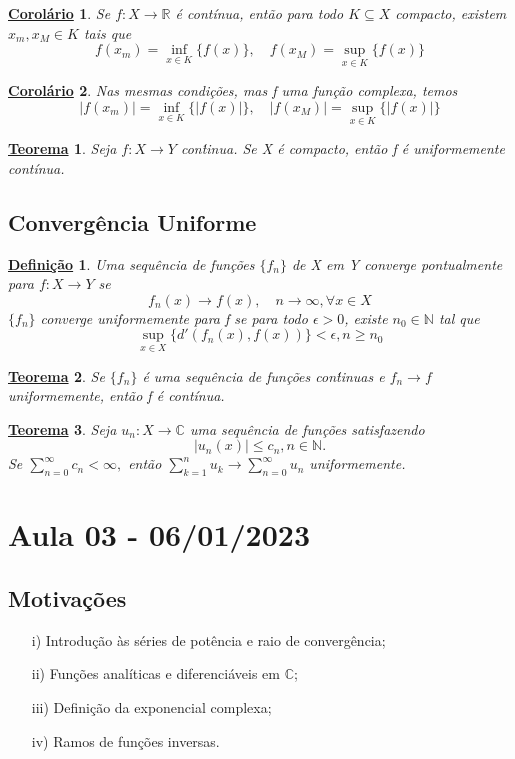\documentclass{article}
\newtheorem*{def*}{\underline{Defini\c c\~ao}}
\newtheorem*{theorem*}{\underline{Teorema}}
\newtheorem*{crl*}{\underline{Corol\'ario}}
\begin{document}
\begin{crl*}
  Se $f:X\rightarrow \mathbb{R}$ \'e cont\'inua, ent\~ao para todo $K \subseteq{X}$ compacto, existem $x _{m}, x _{M}\in{K}$
tais que 
  $$
  f(x _{m}) = \inf _{x\in{K}} \{f(x)\}, \quad f(x _{M}) = \sup _{x\in{K}} \{f(x)\}
  $$
\end{crl*}
\begin{crl*}
  Nas mesmas condi\c c\~oes, mas f uma fun\c c\~ao complexa, temos 
  $$
  |f(x _{m})| = \inf _{x\in{K}} \{|f(x)|\}, \quad |f(x _{M})| = \sup _{x\in{K}} \{|f(x)|\}
  $$
\end{crl*}
\begin{theorem*}
  Seja $f:X\rightarrow Y$ con\'tinua. Se X \'e compacto, ent\~ao f \'e uniformemente cont\'inua.
\end{theorem*}

\subsection{Converg\^encia Uniforme}
\begin{def*}
  Uma sequ\^encia de fun\c c\~oes $\{f_{n}\}$ de X em Y converge pontualmente para $f:X\rightarrow Y$ se 
  $$
  f_{n}(x)\to f(x), \quad n\to\infty, \forall{x\in{X}}
  $$
  $\{f_{n}\}$ converge uniformemente para f se para todo $\epsilon > 0$, existe $n_{0}\in \mathbb{N}$ tal que
  $$
  \sup _{x\in{X}} \{d'(f_{n}(x), f(x))\} < \epsilon, n\geq{n_{0}}
  $$  
\end{def*}
\begin{theorem*}
  Se $\{f_{n}\}$ \'e uma sequ\^encia de fun\c c\~oes con\'tinuas e $f_{n}\to{f}$ uniformemente, ent\~ao f \'e cont\'inua.
\end{theorem*}
\begin{theorem*}
  Seja $u_{n}:X\rightarrow \mathbb{C}$ uma sequ\^encia de fun\c c\~oes satisfazendo
  $$
  |u_{n}(x)|\leq c_{n}, n\in \mathbb{N}.
  $$
  Se $\sum\limits_{n=0}^{\infty}c_{n} < \infty,$ ent\~ao $\sum\limits_{k=1}^{n}u_{k}\to \sum\limits_{n=0}^{\infty}u_{n}$ uniformemente.
\end{theorem*}

\section{Aula 03 - 06/01/2023}
\subsection{Motiva\c c\~oes}
\begin{itemize}
  \item[i)] Introdu\c c\~ao \`as s\'eries de pot\^encia e raio de converg\^encia;
  \item[ii)] Fun\c c\~oes anal\'iticas e diferenci\'aveis em $\mathbb{C}$;
  \item[iii)] Defini\c c\~ao da exponencial complexa;
  \item[iv)] Ramos de fun\c c\~oes inversas.
\end{itemize}
\end{document}
